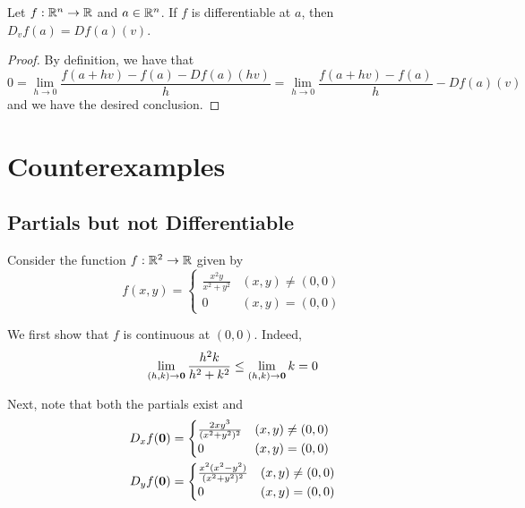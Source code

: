 \begin{lemma}
    Let $f:\mathbb{R}^n\to\mathbb{R}$ and $a\in\mathbb{R}^n$. If $f$ is differentiable at $a$, then $D_vf(a) = Df(a)(v)$.
\end{lemma}
\begin{proof}
    By definition, we have that 
    \begin{equation*}
        0 = \lim_{h\to0}\frac{f(a + hv) - f(a) - Df(a)(hv)}{h} = \lim_{h\to0}\frac{f(a + hv) - f(a)}{h} - Df(a)(v)
    \end{equation*}
    and we have the desired conclusion.
\end{proof}

\section{Counterexamples}

\subsection*{Partials but not Differentiable}

Consider the function $f:\mathbb{R}^2\to\mathbb{R}$ given by 
\begin{equation*}
    f(x,y) = 
    \begin{cases}
        \frac{x^2y}{x^2 + y^2} & (x,y)\ne(0,0)\\
        0 & (x,y) = (0,0)
    \end{cases}
\end{equation*}

We first show that $f$ is continuous at $(0,0)$. Indeed,
\begin{equation*}
    \lim_{(h,k)\to\mathbf{0}}\frac{h^2k}{h^2 + k^2}\le\lim_{(h,k)\to\mathbf{0}}k = 0
\end{equation*}

Next, note that both the partials exist and 
\begin{align*}
    D_xf(\mathbf{0}) &= 
    \begin{cases}
        \frac{2xy^3}{(x^2 + y^2)^2} & (x,y)\ne(0,0)\\
        0 & (x,y) = (0,0)
    \end{cases}\\
    D_yf(\mathbf{0}) &= 
    \begin{cases}
        \frac{x^2(x^2 - y^2)}{(x^2 + y^2)^2} & (x,y)\ne(0,0)\\
        0 & (x,y) = (0,0)
    \end{cases}
\end{align*}

